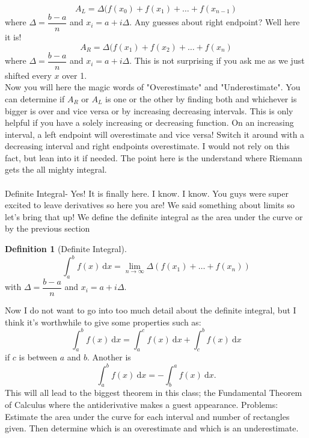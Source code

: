 \documentclass[10pt]{article}
\newcommand{\dx}{\:\mathrm{d}x}
\theoremstyle{Theorem}
\theoremstyle{definition}
\newtheorem{definition}{Definition}[section]
\theoremstyle{remark}
\theoremstyle{custom}
\begin{document}
\begin{equation}
A_L=\Delta(f(x_0)+f(x_1)+\ldots +f(x_{n-1})
\end{equation}
where $\Delta=\dfrac{b-a}{n}$ and $x_i=a+i\Delta$. Any guesses about right endpoint? Well here it is!
\begin{equation}
A_R=\Delta(f(x_1)+f(x_2)+\ldots +f(x_{n})
\end{equation}
where $\Delta=\dfrac{b-a}{n}$ and $x_i=a+i\Delta$.  This is not surprising if you ask me as we just shifted every $x$ over 1.\\
Now you will here the magic words of "Overestimate" and "Underestimate". You can determine if $A_R$ or $A_L$ is one or the other by finding both and whichever is bigger is over and vice versa or by increasing decreasing intervals. This is only helpful if you have a solely increasing or decreasing function. On an increasing interval, a left endpoint will overestimate and vice versa! Switch it around with a decreasing interval and right endpoints overestimate. I would not rely on this fact, but lean into it if needed. The point here is the understand where Riemann gets the all mighty integral.\\\\
Definite Integral- Yes! It is finally here. I know. I know. You guys were super excited to leave derivatives so here you are! We said something about limits so let's bring that up! We define the definite integral as the area under the curve or by the previous section
\begin{definition}[Definite Integral]
\[
\int_a^bf(x)\dx=\lim_{n\rightarrow \infty}\Delta (f(x_1)+\ldots+f(x_n))
\]
with $\Delta = \dfrac{b-a}{n}$ and $x_i=a+i\Delta$.
\end{definition} 
Now I do not want to go into too much detail about the definite integral, but I think it's worthwhile to give some properties such as:
\[
\int_a^bf(x)\dx=\int_a^cf(x)\dx+\int_c^bf(x)\dx
\]
if $c$ is between $a$ and $b$. Another is
\[
\int_a^bf(x)\dx=-\int_b^af(x)\dx.
\]
This will all lead to the biggest theorem in this class; the Fundamental Theorem of Calculus where the antiderivative makes a guest appearance.
\newpage
\noindent
Problems: Estimate the area under the curve for each interval and number of rectangles given. Then determine which is an overestimate and which is an underestimate.
\end{document}

